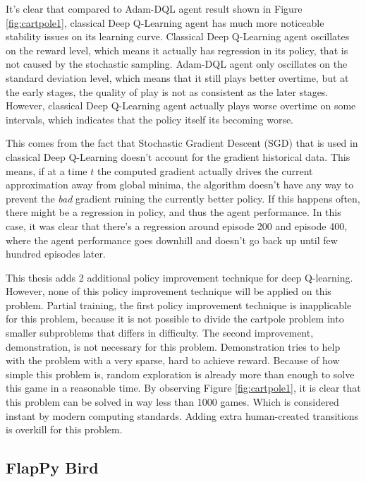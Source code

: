         It's clear that compared to Adam-DQL agent result shown in Figure \ref{fig:cartpole1}, classical Deep Q-Learning agent has much more noticeable stability issues on its learning curve. Classical Deep Q-Learning agent oscillates on the reward level, which means it actually has regression in its policy, that is not caused by the stochastic sampling. Adam-DQL agent only oscillates on the standard deviation level, which means that it still plays better overtime, but at the early stages, the quality of play is not as consistent as the later stages. However, classical Deep Q-Learning agent actually plays worse overtime on some intervals, which indicates that the policy itself its becoming worse. 
        \par
        This comes from the fact that Stochastic Gradient Descent (SGD) that is used in classical Deep Q-Learning doesn't account for the gradient historical data. This means, if at a time $t$ the computed gradient actually drives the current approximation away from global minima, the algorithm doesn't have any way to prevent the \textit{bad} gradient ruining the currently better policy. If this happens often, there might be a regression in policy, and thus the agent performance. In this case, it was clear that there's a regression around episode 200 and episode 400, where the agent performance goes downhill and doesn't go back up until few hundred episodes later.
         \par
        This thesis adds 2 additional policy improvement technique for deep Q-learning. However, none of this policy improvement technique will be applied on this problem. Partial training, the first policy improvement technique is inapplicable for this problem, because it is not possible to divide the cartpole problem into smaller subproblems that differs in difficulty. The second improvement, demonstration, is not necessary for this problem. Demonstration tries to help with the problem with a very sparse, hard to achieve reward. Because of how simple this problem is, random exploration is already more than enough to solve this game in a reasonable time. By observing Figure \ref{fig:cartpole1}, it is clear that this problem can be solved in way less than 1000 games. Which is considered instant by modern computing standards. Adding extra human-created transitions is overkill for this problem. 
         
    \subsection{FlapPy Bird}
        
